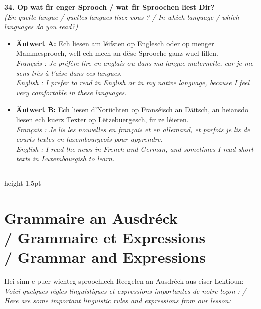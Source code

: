 \noindent\textbf{34. Op wat fir enger Sprooch / wat fir Sproochen liest Dir?}\\
\textit{(En quelle langue / quelles langues lisez-vous ? / In which language / which languages do you read?)}
\begin{itemize}
    \item \textbf{Äntwert A:} Ech liesen am léifsten op Englesch oder op menger Mammesprooch, well ech mech an dëse Sprooche ganz wuel fillen.\\
    \textit{Français : Je préfère lire en anglais ou dans ma langue maternelle, car je me sens très à l'aise dans ces langues.}\\
    \textit{English : I prefer to read in English or in my native language, because I feel very comfortable in these languages.}
    \item \textbf{Äntwert B:} Ech liesen d'Noriichten op Franséisch an Däitsch, an heiansdo liesen ech kuerz Texter op Lëtzebuergesch, fir ze léieren.\\
    \textit{Français : Je lis les nouvelles en français et en allemand, et parfois je lis de courts textes en luxembourgeois pour apprendre.}\\
    \textit{English : I read the news in French and German, and sometimes I read short texts in Luxembourgish to learn.}
\end{itemize}

\vspace{1.5cm}
\color{geminiBlue}\hrule height 1.5pt \vspace{0.5em}\color{black}

\section[Grammaire an Ausdréck / Grammaire / Grammar]{Grammaire an Ausdréck \\/ Grammaire et Expressions \\/ Grammar and Expressions}

Hei sinn e puer wichteg sproochlech Reegelen an Ausdréck aus eiser Lektioun: \\
\textit{Voici quelques règles linguistiques et expressions importantes de notre leçon : / Here are some important linguistic rules and expressions from our lesson:}


